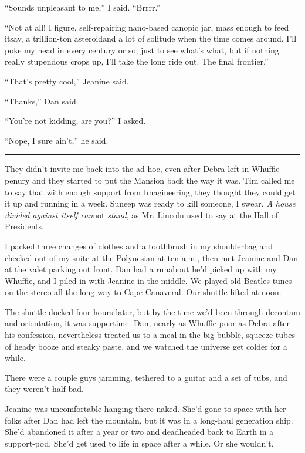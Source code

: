 “Sounds unpleasant to me,” I said. “Brrrr.”

“Not at all! I figure, self-repairing nano-based canopic jar, mass
enough to feed it{\dash}say, a trillion-ton asteroid{\dash}and a lot of
solitude when the time comes around. I'll poke my head in every
century or so, just to see what's what, but if nothing really
stupendous crops up, I'll take the long ride out. The final
frontier.”

“That's pretty cool,” Jeanine said.

“Thanks,” Dan said.

“You're not kidding, are you?” I asked.

“Nope, I sure ain't,” he said.

\begin{center}\rule{3in}{0.4pt}\end{center}

They didn't invite me back into the ad-hoc, even after Debra left
in Whuffie-penury and they started to put the Mansion back the way
it was. Tim called me to say that with enough support from
Imagineering, they thought they could get it up and running in a
week. Suneep was ready to kill someone, I swear.
\emph{A house divided against itself can}not \emph{stand}, as Mr.
Lincoln used to say at the Hall of Presidents.

I packed three changes of clothes and a toothbrush in my
shoulderbag and checked out of my suite at the Polynesian at ten
a.m., then met Jeanine and Dan at the valet parking out front. Dan
had a runabout he'd picked up with my Whuffie, and I piled in with
Jeanine in the middle. We played old Beatles tunes on the stereo
all the long way to Cape Canaveral. Our shuttle lifted at noon.

The shuttle docked four hours later, but by the time we'd been
through decontam and orientation, it was suppertime. Dan, nearly as
Whuffie-poor as Debra after his confession, nevertheless treated us
to a meal in the big bubble, squeeze-tubes of heady booze and
steaky paste, and we watched the universe get colder for a while.

There were a couple guys jamming, tethered to a guitar and a set of
tubs, and they weren't half bad.

Jeanine was uncomfortable hanging there naked. She'd gone to space
with her folks after Dan had left the mountain, but it was in a
long-haul generation ship. She'd abandoned it after a year or two
and deadheaded back to Earth in a support-pod. She'd get used to
life in space after a while. Or she wouldn't.

